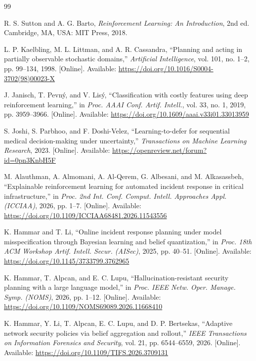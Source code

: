 \documentclass[12pt,a4paper]{article}
\begin{document}
\begin{thebibliography}{99}

 R. S. Sutton and A. G. Barto, \emph{Reinforcement Learning: An Introduction}, 2nd ed. Cambridge, MA, USA: MIT Press, 2018.

 L. P. Kaelbling, M. L. Littman, and A. R. Cassandra, ``Planning and acting in partially observable stochastic domains,'' \emph{Artificial Intelligence}, vol. 101, no. 1--2, pp. 99--134, 1998. [Online]. Available: \url{https://doi.org/10.1016/S0004-3702(98)00023-X}

 J. Janisch, T. Pevn\'{y}, and V. Lis\'{y}, ``Classification with costly features using deep reinforcement learning,'' in \emph{Proc. AAAI Conf. Artif. Intell.}, vol. 33, no. 1, 2019, pp. 3959--3966. [Online]. Available: \url{https://doi.org/10.1609/aaai.v33i01.33013959}

 S. Joshi, S. Parbhoo, and F. Doshi-Velez, ``Learning-to-defer for sequential medical decision-making under uncertainty,'' \emph{Transactions on Machine Learning Research}, 2023. [Online]. Available: \url{https://openreview.net/forum?id=0pn3KnbH5F}

 M. Alauthman, A. Almomani, A. Al-Qerem, G. Albesani, and M. Alkasassbeh, ``Explainable reinforcement learning for automated incident response in critical infrastructure,'' in \emph{Proc. 2nd Int. Conf. Comput. Intell. Approaches Appl. (ICCIAA)}, 2026, pp. 1--7. [Online]. Available: \url{https://doi.org/10.1109/ICCIAA68481.2026.11543556}

 K. Hammar and T. Li, ``Online incident response planning under model misspecification through Bayesian learning and belief quantization,'' in \emph{Proc. 18th ACM Workshop Artif. Intell. Secur. (AISec)}, 2025, pp. 40--51. [Online]. Available: \url{https://doi.org/10.1145/3733799.3762965}

 K. Hammar, T. Alpcan, and E. C. Lupu, ``Hallucination-resistant security planning with a large language model,'' in \emph{Proc. IEEE Netw. Oper. Manage. Symp. (NOMS)}, 2026, pp. 1--12. [Online]. Available: \url{https://doi.org/10.1109/NOMS69089.2026.11668410}

 K. Hammar, Y. Li, T. Alpcan, E. C. Lupu, and D. P. Bertsekas, ``Adaptive network security policies via belief aggregation and rollout,'' \emph{IEEE Transactions on Information Forensics and Security}, vol. 21, pp. 6544--6559, 2026. [Online]. Available: \url{https://doi.org/10.1109/TIFS.2026.3709131}


\end{thebibliography}
\end{document}

